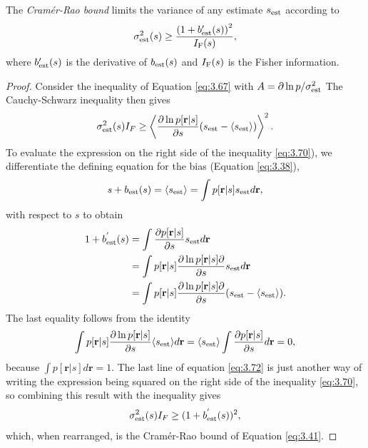 \begin{prop}
  The \emph{Cramér-Rao bound} limits the variance of any estimate $s_{\rm{est}}$
  according to
  \begin{equation}
    \label{eq:3.41}
     \sigma_{\rm{est}}^{2}(s)\geq \frac{\left( 1+b_{\rm{est}}'(s) \right)^{2}}{I_{\rm{F}}(s)},
   \end{equation}
   where $b_{\rm{est}}'(s)$ is the derivative of $b_{\rm{est}}(s)$ and $I_{\rm{F}}(s)$ is the Fisher
   information.

\begin{proof}
Consider the inequality of Equation \ref{eq:3.67}
   with $A=\partial \ln p/\sigma_{\rm{est}}^{2}$
   The Cauchy-Schwarz inequality then gives
\begin{equation}
\sigma_{\rm{est}}^2(s)I_F\geq\left\langle\frac{\partial \ln p[\mathbf{r}|s]}{\partial s}(s_{\rm{est}}-\langle s_{\rm{est}}\rangle)\right\rangle^2.
\label{eq:3.70}
\end{equation}
To evaluate the expression on the right side of the inequality \ref{eq:3.70}), we differentiate the defining equation for the bias (Equation \ref{eq:3.38}),
  \begin{equation}
s+b_{\rm{est}}(s)=\langle s_{\rm{est}}\rangle=\int p[\mathbf{r}|s]s_{\rm{est}}d\mathbf{r},
\label{eq:3.71}
\end{equation}
with respect to $s$ to obtain
\begin{equation}
\begin{aligned}
1+b_{\rm{est}}^{'}(s)&=\int\frac{\partial p[\mathbf{r}|s]}{\partial s}s_{\rm{est}}d\mathbf{r}\\
&=\int p[\mathbf{r}|s]\frac{\partial\ln p[\mathbf{r}|s]\partial}{\partial s}s_{\rm{est}}d\mathbf{r}\\
&=\int p[\mathbf{r}|s]\frac{\partial\ln p[\mathbf{r}|s]\partial}{\partial s}(s_{\rm{est}}-\langle s_{\rm{est}}\rangle).
\end{aligned}
\label{eq:3.72}
\end{equation}
The last equality follows from the identity
\begin{equation}
\int p[\mathbf{r}|s]\frac{\partial\ln p[\mathbf{r}|s]}{\partial s}\langle s_{\rm{est}}\rangle d\mathbf{r}=\langle s_{\rm{est}}\rangle\int\frac{\partial p[\mathbf{r}|s]}{\partial s}d\mathbf{r}=0,
\label{eq:3.73}
\end{equation}
because $\int p[\mathbf{r}|s]d\mathbf{r}=1$. The last line of equation  \ref{eq:3.72} is just another way
of writing the expression being squared on the right side of the inequality
\ref{eq:3.70}, so combining this result with the inequality gives
\begin{equation}
\sigma_{\rm{est}}^2(s)I_F\geq(1+b_{\rm{est}}^{'}(s))^2,
\label{eq:3.74}
\end{equation}
which, when rearranged, is the Cramér-Rao bound of Equation \ref{eq:3.41}.
\end{proof}
\end{prop}


